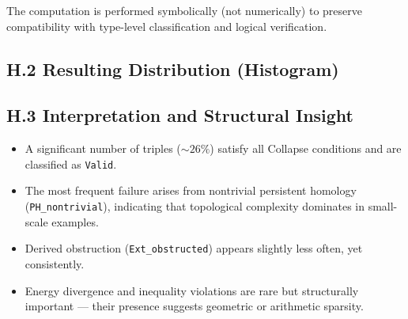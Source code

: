 \documentclass[11pt]{article}
\begin{document}
The computation is performed symbolically (not numerically) to preserve compatibility with type-level classification  
and logical verification.

\subsection*{H.2 Resulting Distribution (Histogram)}

\begin{center}
\end{center}


\subsection*{H.3 Interpretation and Structural Insight}

\begin{itemize}
  \item A significant number of triples (\( \sim 26\% \)) satisfy all Collapse conditions and are classified as \texttt{Valid}.
  \item The most frequent failure arises from nontrivial persistent homology (\texttt{PH\_nontrivial}),  
  indicating that topological complexity dominates in small-scale examples.
  \item Derived obstruction (\texttt{Ext\_obstructed}) appears slightly less often, yet consistently.
  \item Energy divergence and inequality violations are rare but structurally important — their presence  
  suggests geometric or arithmetic sparsity.
\end{itemize}
\end{document}
